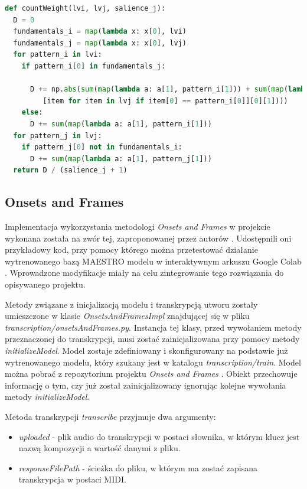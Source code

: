 \documentclass[12pt,a4paper,twoside]{mwart}
\begin{document}
\begin{lstlisting}[language=Python, caption={Funkcja wyliczająca wagę krawędzi w algorytmie śledzenia wysokości nut}, captionpos=b, label={code:petrusPitchTracking}, numbers=none]
def countWeight(lvi, lvj, salience_j):
  D = 0
  fundamentals_i = map(lambda x: x[0], lvi)
  fundamentals_j = map(lambda x: x[0], lvj)
  for pattern_i in lvi:
    if pattern_i[0] in fundamentals_j:
      
      D += np.abs(sum(map(lambda a: a[1], pattern_i[1])) + sum(map(lambda a: a[1],
         [item for item in lvj if item[0] == pattern_i[0]][0][1])))
    else:
      D += sum(map(lambda a: a[1], pattern_i[1]))
  for pattern_j in lvj:
    if pattern_j[0] not in fundamentals_i:
      D += sum(map(lambda a: a[1], pattern_j[1]))
  return D / (salience_j + 1)
\end{lstlisting}

\subsection{Onsets and Frames}\label{sec:impl:onsetsAndFrames}
Implementacja wykorzystania metodologi \textit{Onsets and Frames} w projekcie wykonana została na zwór tej, zaproponowanej przez autorów \cite{Transcription:Hawthorne:OnsetsAndFrames}. Udostępnili oni przykładowy kod, przy pomocy którego można przetestować działanie wytrenowanego bazą MAESTRO modelu w interaktywnym arkuszu Google Colab \cite{Transcription:OnsetsAndFrames:Colab}. Wprowadzone modyfikacje miały na celu zintegrowanie tego rozwiązania do opisywanego projektu.

Metody związane z inicjalizacją modelu i transkrypcją utworu zostały umieszczone w klasie \textit{OnsetsAndFramesImpl} znajdującej się w pliku \textit{transcription/onsetsAndFrames.py}. Instancja tej klasy, przed wywołaniem metody przeznaczonej do transkrypcji, musi zostać zainicjalizowana przy pomocy metody \textit{initializeModel}. Model zostaje zdefiniowany i skonfigurowany na podstawie już wytrenowanego modelu, który szukany jest w katalogu \textit{transcription/train}. Model można pobrać z repozytorium projektu \textit{Onsets and Frames} \cite{Transcription:OnsetsAndFrames:Github}. Obiekt przechowuje informację o tym, czy już został zainicjalizowany ignorując kolejne wywołania metody \textit{initializeModel}.

Metoda transkrypcji \textit{transcribe} przyjmuje dwa argumenty:
\begin{itemize}
  \item  \textit{uploaded} - plik audio do transkrypcji w postaci słownika, w którym klucz jest nazwą kompozycji a wartość danymi z pliku. 
  \item \textit{responseFilePath} - ścieżka do pliku, w którym ma zostać zapisana transkrypcja w postaci MIDI.
\end{itemize}
\end{document}
